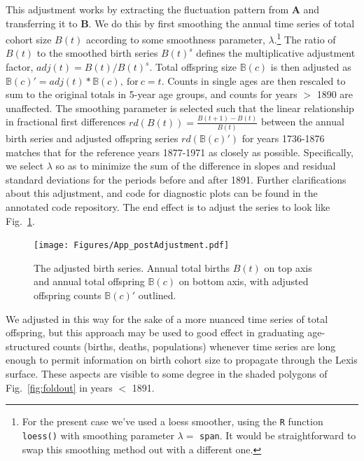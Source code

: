 This adjustment works by extracting the fluctuation pattern from \textbf{A} and transferring it to \textbf{B}. We do this by first smoothing the annual time series of total cohort size $B(t)$ according to some smoothness parameter, $\lambda$.\footnote{For the present case we've used a loess smoother, using the \texttt{R} function \texttt{loess()} with smoothing parameter $\lambda =$ \texttt{span}. It would be straightforward to swap this smoothing method out with a different one.} The ratio of $B(t)$ to the smoothed birth series $B(t)^s$ defines the multiplicative adjustment factor, $adj(t) = B(t)/B(t)^s$. Total offspring size $\mathbb{B}(c)$ is then adjusted as $\mathbb{B}(c)' = adj(t)*\mathbb{B}(c), \mathrm{~for~} c = t$. Counts in single ages are then rescaled to sum to the original totals in 5-year age groups, and counts for years $>$ 1890 are unaffected. The smoothing parameter is selected such that the linear relationship in fractional first differences $rd(B(t)) = \frac{B(t+1)-B(t)}{B(t)}$ between the annual birth series and adjusted offspring series $rd(\mathbb{B}(c)')$ for years 1736-1876 matches that for the reference years 1877-1971 as closely as possible. Specifically, we select $\lambda$ so as to minimize the sum of the difference in slopes and residual standard deviations for the periods before and after 1891. Further clarifications about this adjustment, and code for diagnostic plots can be found in the annotated code repository. The end effect is to adjust the series to look like Fig.~\ref{fig:better}.
					
					\begin{figure}[ht!]
					\centering
					\texttt{[image: Figures/App\_postAdjustment.pdf]}
					\caption{The adjusted birth series. Annual total births $B(t)$ on top axis and annual total offspring $\mathbb{B}(c)$ on bottom axis, with adjusted offspring counts $\mathbb{B}(c)'$ outlined.}
\label{fig:better}
\end{figure}


We adjusted in this way for the sake of a more nuanced time series of total offspring, but this approach may be used to good effect in graduating age-structured counts (births, deaths, populations) whenever time series are long enough to permit information on birth cohort size to propagate through the Lexis surface. These aspects are visible to some degree in the shaded polygons of Fig.~\ref{fig:foldout} in years $<$ 1891.

\FloatBarrier
